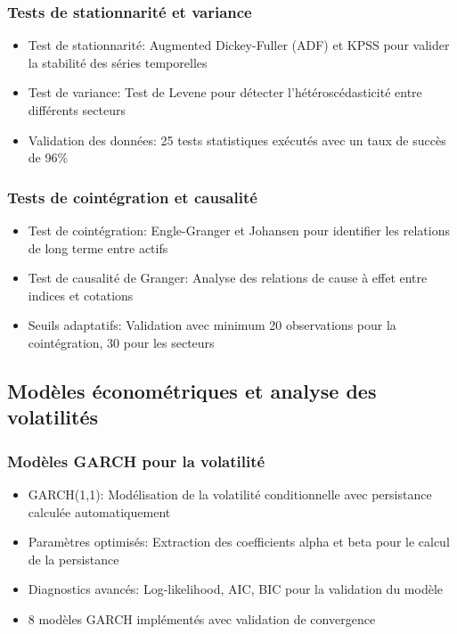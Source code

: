 \documentclass[12pt,a4paper]{article}
\begin{document}
\subsubsection{Tests de stationnarité et variance}
\begin{itemize}
    \item Test de stationnarité: Augmented Dickey-Fuller (ADF) et KPSS pour valider la stabilité des séries temporelles
    \item Test de variance: Test de Levene pour détecter l'hétéroscédasticité entre différents secteurs
    \item Validation des données: 25 tests statistiques exécutés avec un taux de succès de 96\%
\end{itemize}

\subsubsection{Tests de cointégration et causalité}
\begin{itemize}
    \item Test de cointégration: Engle-Granger et Johansen pour identifier les relations de long terme entre actifs
    \item Test de causalité de Granger: Analyse des relations de cause à effet entre indices et cotations
    \item Seuils adaptatifs: Validation avec minimum 20 observations pour la cointégration, 30 pour les secteurs
\end{itemize}

\subsection{Modèles économétriques et analyse des volatilités}
\subsubsection{Modèles GARCH pour la volatilité}
\begin{itemize}
    \item GARCH(1,1): Modélisation de la volatilité conditionnelle avec persistance calculée automatiquement
    \item Paramètres optimisés: Extraction des coefficients alpha et beta pour le calcul de la persistance
    \item Diagnostics avancés: Log-likelihood, AIC, BIC pour la validation du modèle
    \item 8 modèles GARCH implémentés avec validation de convergence
\end{itemize}
\end{document}

